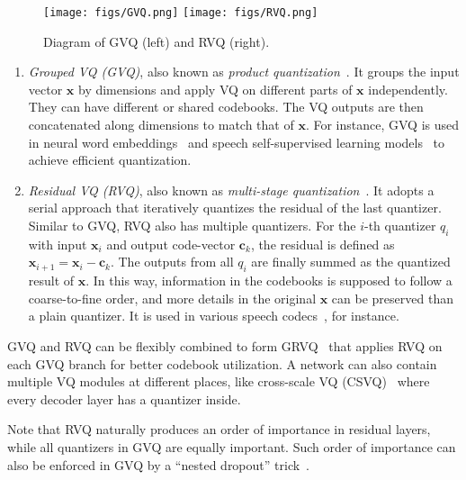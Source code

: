 \begin{figure}
    \centering
    \texttt{[image: figs/GVQ.png]}
    \texttt{[image: figs/RVQ.png]}
    \caption{Diagram of GVQ (left) and RVQ (right).}
    \label{fig:gvq-rvq}
\end{figure}

\begin{enumerate}[leftmargin=5mm]
    \item \textit{Grouped VQ (GVQ)}, also known as \textit{product quantization}~\cite{product_quantization}. It groups the input vector $\bm x$ by dimensions and apply VQ on different parts of $\bm x$ independently. They can have different or shared codebooks. The VQ outputs are then concatenated along dimensions to match that of $\bm x$. For instance, GVQ is used in neural word embeddings~\cite{9164982} and speech self-supervised learning models~\cite{vq-wav2vec,baevski2020wav2vec} to achieve efficient quantization.
    \item \textit{Residual VQ (RVQ)}, also known as \textit{multi-stage quantization}~\cite{multiple-stage-vector-quantization}. It adopts a serial approach that iteratively quantizes the residual of the last quantizer.
    Similar to GVQ, RVQ also has multiple quantizers.
    For the $i$-th quantizer $q_i$ with input $\bm x_i$ and output code-vector $\bm c_{k}$, the residual is defined as $\bm x_{i+1}=\bm x_i-\bm c_{k}$.
    The outputs from all $q_i$ are finally summed as the quantized result of $\bm x$.
    In this way, information in the codebooks is supposed to follow a coarse-to-fine order, and more details in the original $\bm x$ can be preserved than a plain quantizer.
    It is used in various speech codecs~\cite{zeghidour2021soundstream,encodec,kumar2024high}, for instance.
\end{enumerate}
GVQ and RVQ can be flexibly combined to form GRVQ~\cite{yang2023hifi} that applies RVQ on each GVQ branch for better codebook utilization.
A network can also contain multiple VQ modules at different places, like cross-scale VQ (CSVQ)~\cite{jiang22_interspeech} where every decoder layer has a quantizer inside.

Note that RVQ naturally produces an order of importance in residual layers, while all quantizers in GVQ are equally important.
Such order of importance can also be enforced in GVQ by a ``nested dropout'' trick~\cite{rippel2014learning}.
